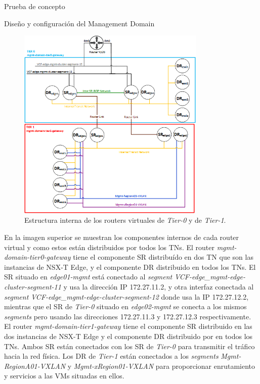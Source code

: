 \begin{section}{Prueba de concepto}
\begin{subsection}{Diseño y configuración del Management Domain}
    \begin{figure}[h]
      \centering
      \includegraphics[width=0.8\textwidth]{imaxes/pruebaconcepto/EstructuraInternaTiers.png}
      \caption{Estructura interna de los routers virtuales de \textit{Tier-0} y de \textit{Tier-1}.}
      \label{fig:estructura-interna-TwoTier-Routing-NSXT}
    \end{figure}
    \FloatBarrier
    En la imagen superior se muestran los componentes internos de cada router virtual y como estos están distribuidos por todos los TNs. El router \textit{mgmt-domain-tier0-gateway} tiene el componente SR distribuído en dos TN que son las instancias de NSX-T Edge, y el componente DR distribuido en todos los TNs. El SR situado en \textit{edge01-mgmt} está conectado al \textit{segment} \textit{VCF-edge\_mgmt-edge-cluster-segment-11} y usa la dirección IP 172.27.11.2, y otra interfaz conectada al \textit{segment} \textit{VCF-edge\_mgmt-edge-cluster-segment-12} donde usa la IP 172.27.12.2, mientras que el SR de \textit{Tier-0} situado en \textit{edge02-mgmt} se conecta a los mismos \textit{segments} pero usando las direcciones 172.27.11.3 y 172.27.12.3 respectivamente. El router \textit{mgmt-domain-tier1-gateway} tiene el componente SR distribuido en las dos instancias de NSX-T Edge y el componente DR distribuido por en todos los TNs. Ambos SR están conectados con los SR de \textit{Tier-0} para transmitir el tráfico hacia la red física. Los DR de \textit{Tier-1} están conectados a los \textit{segments} \textit{Mgmt-RegionA01-VXLAN} y \textit{Mgmt-xRegion01-VXLAN} para proporcionar enrutamiento y servicios a las VMs situadas en ellos.
    

\end{subsection}
\end{section}
